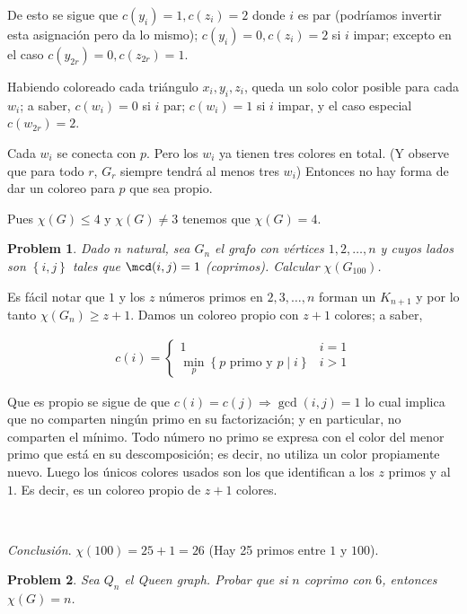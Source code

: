 \documentclass[a4paper]{article}
\newtheorem{problem}{Problem}
\newtheorem{problem}{Problem}
\begin{document}
De esto se sigue que $c(y_i) = 1, c(z_i) = 2$ donde $i$ es par (podríamos
invertir esta asignación pero da lo mismo); $c(y_i) = 0, c(z_i) = 2$ si $i$
impar; excepto en el caso $c(y_{2r}) = 0, c(z_{2r}) = 1$.

Habiendo coloreado cada triángulo $x_i, y_i, z_i$, queda un solo color posible
para cada $w_i$; a saber, $c(w_i) = 0$ si $i$ par; $c(w_i) = 1$ si $i$ impar, y
el caso especial $c(w_{2r}) = 2$.

Cada $w_i$ se conecta con $p$. Pero los $w_i$ ya tienen tres colores en total.
(Y observe que para todo $r$, $G_r$ siempre tendrá al menos tres $w_i$) Entonces
no hay forma de dar un coloreo para $p$ que sea propio.

Pues $\chi(G) \leq 4$ y $\chi(G) \neq 3$ tenemos que $\chi(G) = 4$.
\pagebreak
\begin{problem}
    Dado $n$ natural, sea $G_n$ el grafo con vértices $1, 2, \ldots, n$ y cuyos
    lados son $\left\{ i, j \right\} $ tales que $\mcd(i, j) = 1$ (coprimos).
    Calcular $\chi(G_{100})$.
\end{problem}

Es fácil notar que $1$ y los $z$ números primos en $2, 3, \ldots, n$ forman un
$K_{n+1}$ y por lo tanto $\chi(G_{n}) \geq z + 1$. Damos un coloreo propio con $z +
1$ colores; a saber,


\begin{align*}
    c(i) = \begin{cases}
        1 & i = 1 \\ 
        \min_{p} \left\{ p \text{ primo  y } p \mid i  \right\}  & i > 1
    \end{cases}
\end{align*}

Que es propio se sigue de que $c(i) = c(j) \Rightarrow \gcd(i, j) = 1$ lo cual
implica que no comparten ningún primo en su factorización; y en particular, no
comparten el mínimo. Todo número no primo se expresa con el color del menor
primo que está en su descomposición; es decir, no utiliza un color propiamente
nuevo. Luego los únicos colores usados son los que identifican a los $z$ primos
y al $1$. Es decir, es un coloreo propio de $z + 1$ colores. 

~ 

\textit{Conclusión}. $\chi(100) = 25 + 1 = 26$ (Hay 25 primos entre $1$ y
$100$).

\pagebreak

\begin{problem}
    Sea $Q_n$ el Queen graph. Probar que si $n$ coprimo con $6$, entonces
    $\chi(G) = n$.
\end{problem}
\end{document}
